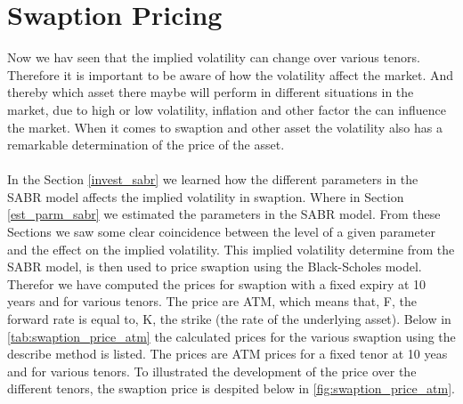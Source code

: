 \section{Swaption Pricing} \label{swaption_price_sec}
Now we hav seen that the implied volatility can change over various tenors. 
Therefore it is important to be aware of how the volatility affect the market.
And thereby which asset there maybe will perform in different situations in the market,
due to high or low volatility, inflation and other factor the can influence the market.
When it comes to swaption and other asset the volatility also has
a remarkable determination of the price of the asset. 
\\\\
In the Section \ref{invest_sabr} we learned how the different parameters in the 
SABR model affects the implied volatility in swaption. 
Where in Section \ref{est_parm_sabr} we estimated the parameters in the SABR model. 
From these Sections we saw some clear coincidence between the level of a given parameter
and the effect on the implied volatility. 
This implied volatility determine from the SABR model, is then used to price swaption using the 
Black-Scholes model. 
Therefor we have computed the prices for swaption with a fixed expiry at 10 years and for various tenors. 
The price are ATM, which means that, F, the forward rate is equal to, K, 
the strike (the rate of the underlying asset). 
Below in \autoref{tab:swaption_price_atm} the calculated prices for the various swaption 
using the describe method is listed. 
The prices are ATM prices for a fixed tenor at 10 yeas and for various tenors. 
To illustrated the development of the price over the different tenors, 
the swaption price is despited below in  \autoref{fig:swaption_price_atm}.
\begin{table}[H]
  \centering
  \caption{ATM swaption price in basis point for a 10 years fixed expiry and various tenors.
  \\ Data source Citi Velocity 21.02.2024}
  \label{tab:swaption_price_atm}
\end{table}
